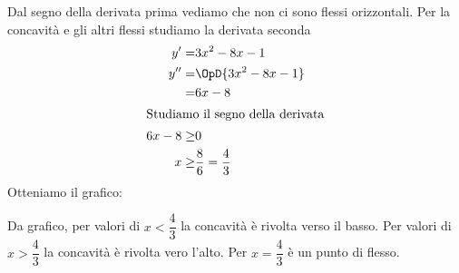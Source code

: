 \begin{exercise}
\begin{itemize}
Dal segno della derivata prima  vediamo che non ci sono flessi orizzontali.
Per la concavità e gli altri flessi studiamo la derivata seconda
\begin{align*}
y'=&3x^2-8x-1\\
y''=&\OpD{3x^2-8x-1}\\
=&6x-8\\
\intertext{Studiamo il segno della derivata}
6x-8\geq&0\\
x\geq&\dfrac{8}{6}=\dfrac{4}{3}\\
\end{align*}
Otteniamo il grafico:
\begin{center}
	
\end{center}
Da grafico, per valori di $x<\dfrac{4}{3}$ la concavità è rivolta verso il basso. Per valori di $x>\dfrac{4}{3}$   la concavità è rivolta vero l'alto. Per $x=\dfrac{4}{3}$ è un punto di flesso.
	\begin{center}
		
	\end{center}
\end{itemize}
\end{exercise}

